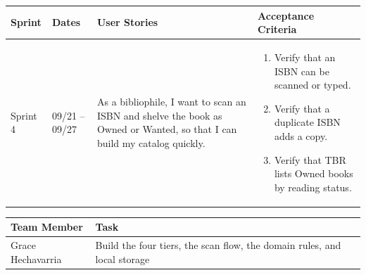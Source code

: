 \documentclass[12pt]{article}
\begin{document}
\vspace{1.5em}

\noindent\begin{minipage}{\linewidth}

\vspace{0.5em}
\noindent
\begin{tabular}{|L{1.2cm}|L{1.8cm}|L{5.2cm}|L{6.3cm}|}
\hline
\textbf{Sprint} & \textbf{Dates} & \textbf{User Stories} & \textbf{Acceptance Criteria} \\
\hline
Sprint 4 & 09/21 -- 09/27 &
As a bibliophile, I want to scan an ISBN and shelve the book as Owned or Wanted, so that I can build my catalog quickly. &
\begin{enumerate}
    \item Verify that an ISBN can be scanned or typed.
    \item Verify that a duplicate ISBN adds a copy.
    \item Verify that TBR lists Owned books by reading status.
\end{enumerate} \\
\hline
\end{tabular}

\vspace{0.5em}
\noindent
\begin{tabular}{|L{3.4cm}|L{11.6cm}|}
\hline
\textbf{Team Member} & \textbf{Task} \\
\hline
Grace Hechavarria & Build the four tiers, the scan flow, the domain rules, and local storage \\
\hline
\end{tabular}
\end{minipage}

\vspace{1.5em}
\end{document}
